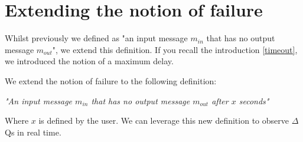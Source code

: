 \section{Extending the notion of failure}
    Whilst previously we defined as "an input message $m_{in}$ that has no output message $m_{out}$", we extend this definition. If you recall the introduction \ref{timeout}, we introduced the notion of a maximum delay.

    We extend the notion of failure to the following definition:
        \begin{center}
            \textit{"An input message $m_{in}$ that has no output message $m_{out}$ after $x$ seconds"}
        \end{center}
    Where $x$ is defined by the user. We can leverage this new definition to observe $\Delta$Qs in real time.

